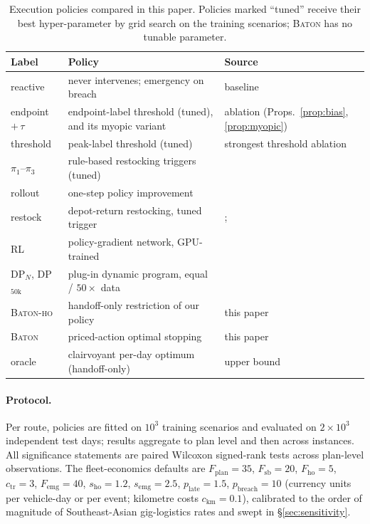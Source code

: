 \documentclass[preprint,authoryear,12pt]{elsarticle}
\theoremstyle{definition}
\theoremstyle{remark}
\begin{document}
\begin{table}[tp]
\caption{Execution policies compared in this paper. Policies marked
``tuned'' receive their best hyper-parameter by grid search on the
training scenarios; \textsc{Baton} has no tunable parameter.}
\label{tab:competitors}
\centering
\small
\setlength{\tabcolsep}{4pt}
\begin{tabular}{l p{4.9cm} p{4.6cm}}
\toprule
Label & Policy & Source \\
\midrule
reactive & never intervenes; emergency on breach & baseline \\
endpoint $+\,\tau$ & endpoint-label threshold (tuned), and its
  myopic variant & ablation (Props.~\ref{prop:bias}, \ref{prop:myopic}) \\
threshold & peak-label threshold (tuned) & strongest threshold ablation \\
$\pi_1$--$\pi_3$ & rule-based restocking triggers (tuned) &
  \citet{salavati2019rule} \\
rollout & one-step policy improvement & \citet{secomandi2001rollout} \\
restock & depot-return restocking, tuned trigger &
  \citet{yang2000stochastic}; \citet{florio2020new} \\
RL & policy-gradient network, GPU-trained &
  \citet{iklassov2024rl} \\
DP$_N$, DP$_{50\mathrm{k}}$ & plug-in dynamic program, equal /
  $50{\times}$ data & \citet{secomandi2009reoptimization} \\
\textsc{Baton-ho} & handoff-only restriction of our policy & this paper \\
\textsc{Baton} & priced-action optimal stopping & this paper \\
oracle & clairvoyant per-day optimum (handoff-only) & upper bound \\
\bottomrule
\end{tabular}
\end{table}

\paragraph{Protocol.} Per route, policies are fitted on $10^3$ training
scenarios and evaluated on $2 \times 10^3$ independent test days;
results aggregate to plan level and then across instances. All
significance statements are paired Wilcoxon signed-rank tests across
plan-level observations. The fleet-economics defaults are
$F_{\mathrm{plan}} = 35$, $F_{\mathrm{sb}} = 20$,
$F_{\mathrm{ho}} = 5$, $c_{\mathrm{tr}} = 3$, $F_{\mathrm{emg}} = 40$,
$s_{\mathrm{ho}} = 1.2$, $s_{\mathrm{emg}} = 2.5$,
$p_{\mathrm{late}} = 1.5$, $p_{\mathrm{breach}} = 10$ (currency units
per vehicle-day or per event; kilometre costs $c_{\mathrm{km}} = 0.1$),
calibrated to the order of magnitude of Southeast-Asian gig-logistics
rates and swept in \S\ref{sec:sensitivity}.
\end{document}
